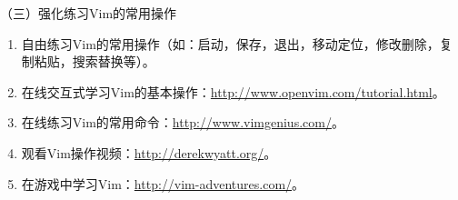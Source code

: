 \vspace{0.1in}
（三）强化练习Vim的常用操作
\begin{enumerate}
  \item 自由练习Vim的常用操作（如：启动，保存，退出，移动定位，修改删除，复制粘贴，搜索替换等）。
  \item 在线交互式学习Vim的基本操作：\href{http://www.openvim.com/tutorial.html}{http://www.openvim.com/tutorial.html}。
  \item 在线练习Vim的常用命令：\href{http://www.vimgenius.com/}{http://www.vimgenius.com/}。
  \item 观看Vim操作视频：\href{http://derekwyatt.org/}{http://derekwyatt.org/}。
  \item 在游戏中学习Vim：\href{http://vim-adventures.com/}{http://vim-adventures.com/}。
\end{enumerate}

